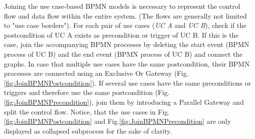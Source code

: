 Joining the use case-based BPMN models is necessary to represent the control flow and data flow within the entire system. (The flows are generally not limited to "use case borders"). For each pair of use cases (\textit{UC A} and \textit{UC B}), check if the postcondition of UC A exists as precondition or trigger of UC B. If this is the case, join the accompanying BPMN processes by deleting the start event (BPMN process of UC B) and the end event (BPMN process of UC B) and connect the graphs. In case that multiple use cases have the same postcondition, their BPMN processes are connected using an Exclusive Or Gateway (Fig.\ref{fig:JoinBPMNPostcondition}). If several use cases have the same preconditions or triggers and therefore use the same postcondition (Fig.\ref{fig:JoinBPMNPrecondition}), join them by introducing a Parallel Gateway and split the control flow. Notice, that the use cases in Fig.\ref{fig:JoinBPMNPostcondition} and Fig.\ref{fig:JoinBPMNPrecondition} are only displayed as collapsed subprocess for the sake of clarity. 

